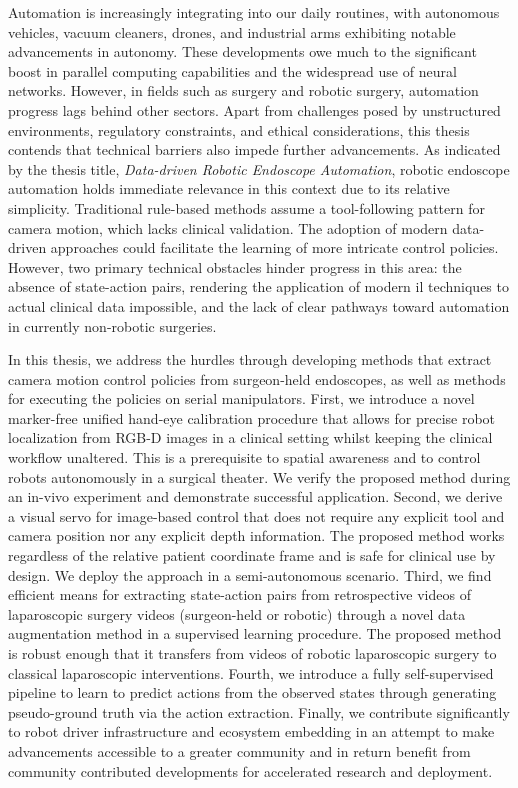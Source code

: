 Automation is increasingly integrating into our daily routines, with autonomous vehicles, vacuum cleaners, drones, and industrial arms exhibiting notable advancements in autonomy. These developments owe much to the significant boost in parallel computing capabilities and the widespread use of neural networks. However, in fields such as surgery and robotic surgery, automation progress lags behind other sectors. Apart from challenges posed by unstructured environments, regulatory constraints, and ethical considerations, this thesis contends that technical barriers also impede further advancements. As indicated by the thesis title, \textit{Data-driven Robotic Endoscope Automation}, robotic endoscope automation holds immediate relevance in this context due to its relative simplicity. Traditional rule-based methods assume a tool-following pattern for camera motion, which lacks clinical validation. The adoption of modern data-driven approaches could facilitate the learning of more intricate control policies. However, two primary technical obstacles hinder progress in this area: the absence of state-action pairs, rendering the application of modern \gls{il} techniques to actual clinical data impossible, and the lack of clear pathways toward automation in currently non-robotic surgeries.

In this thesis, we address the hurdles through developing methods that extract camera motion control policies from surgeon-held endoscopes, as well as methods for executing the policies on serial manipulators. First, we introduce a novel marker-free unified hand-eye calibration procedure that allows for precise robot localization from RGB-D images in a clinical setting whilst keeping the clinical workflow unaltered. This is a prerequisite to spatial awareness and to control robots autonomously in a surgical theater. We verify the proposed method during an in-vivo experiment and demonstrate successful application. Second, we derive a visual servo for image-based control that does not require any explicit tool and camera position nor any explicit depth information. The proposed method works regardless of the relative patient coordinate frame and is safe for clinical use by design. We deploy the approach in a semi-autonomous scenario.
Third, we find efficient means for extracting state-action pairs from retrospective videos of laparoscopic surgery videos (surgeon-held or robotic) through a novel data augmentation method in a supervised learning procedure. The proposed method is
robust enough
that it transfers from videos of robotic laparoscopic surgery to classical laparoscopic interventions. Fourth, we introduce a fully self-supervised pipeline to learn to predict actions from the observed states through generating pseudo-ground truth via the action extraction. Finally, we contribute significantly to robot driver infrastructure and ecosystem embedding in an attempt to make advancements accessible to a greater community and in return benefit from community contributed developments for accelerated research and deployment.

